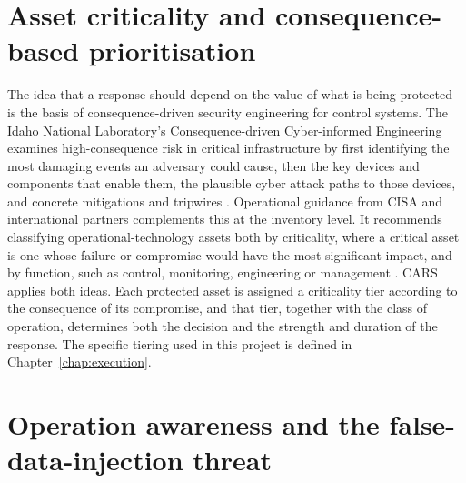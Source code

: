 \section{Asset criticality and consequence-based prioritisation}
\label{sec:criticality}

The idea that a response should depend on the value of what is being protected is the basis of consequence-driven security engineering for control systems. The Idaho National Laboratory's Consequence-driven Cyber-informed Engineering examines high-consequence risk in critical infrastructure by first identifying the most damaging events an adversary could cause, then the key devices and components that enable them, the plausible cyber attack paths to those devices, and concrete mitigations and tripwires \cite{inl2016cce}. Operational guidance from CISA and international partners complements this at the inventory level. It recommends classifying operational-technology assets both by criticality, where a critical asset is one whose failure or compromise would have the most significant impact, and by function, such as control, monitoring, engineering or management \cite{cisa2025assetinventory}. CARS applies both ideas. Each protected asset is assigned a criticality tier according to the consequence of its compromise, and that tier, together with the class of operation, determines both the decision and the strength and duration of the response. The specific tiering used in this project is defined in Chapter~\ref{chap:execution}.

\section{Operation awareness and the false-data-injection threat}
\label{sec:opaware}

